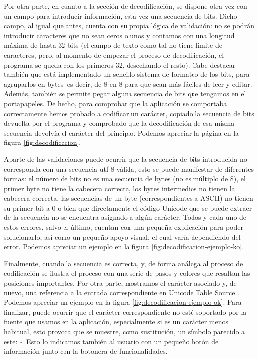 \documentclass{article}
\begin{document}
Por otra parte, en cuanto a la sección de decodificación, se dispone otra vez
con un campo para introducir información, esta vez una secuencia de bits. Dicho
campo, al igual que antes, cuenta con su propia lógica de validación: no se
podrán introducir caracteres que no sean ceros o unos y contamos con una
longitud máxima de hasta 32 bits (el campo de texto como tal no tiene límite de
caracteres, pero, al momento de empezar el proceso de decodificación, el programa
se queda con los primeros 32, desechando el resto). Cabe destacar también que
está implementado un sencillo sistema de formateo de los bits, para agruparlos
en bytes, es decir, de 8 en 8 para que sean más fáciles de leer y editar.
Además, también se permite pegar alguna secuencia de bits que tengamos en el
portapapeles. De hecho, para comprobar que la aplicación se comportaba
correctamente hemos probado a codificar un carácter, copiado la secuencia de
bits devuelta por el programa y comprobado que la decodificación de esa misma
secuencia devolvía el carácter del principio. Podemos apreciar la página en la
figura \ref{fig:decodificacion}.

Aparte de las validaciones puede ocurrir que la secuencia de bits introducida no
corresponda con una secuencia utf-8 válida, esto se puede manifestar de
diferentes formas: el número de bits no es una secuencia de bytes (no es
múltiplo de 8), el primer byte no tiene la cabecera correcta, los bytes
intermedios no tienen la cabecera correcta, las secuencias de un byte
(correspondientes a ASCII) no tienen su primer bit a 0 o bien que directamente
el código Unicode que se puede extraer de la secuencia no se encuentra asignado
a algún carácter. Todos y cada uno de estos errores, salvo el último, cuentan
con una pequeña explicación para poder solucionarlo, así como un pequeño apoyo
visual, el cual varía dependiendo del error. Podemos apreciar un ejemplo en la
figura \ref{fig:decodificacion-ejemplo-ko}.

Finalmente, cuando la secuencia es correcta, y, de forma análoga al proceso de
codificación se ilustra el proceso con una serie de pasos y colores que resaltan
las posiciones importantes. Por otra parte, mostramos el carácter asociado y, de
nuevo, una referencia a la entrada correspondiente en Unicode Table Source
\cite{unicode-table-source}. Podemos apreciar un ejemplo en la figura
\ref{fig:decodificacion-ejemplo-ok}. Para finalizar, puede ocurrir que el
carácter correspondiente no esté soportado por la fuente que usamos en la
aplicación, especialmente si es un carácter menos habitual, esto provoca que se
muestre, como sustitución, un símbolo parecido a este: $\square$. Esto lo indicamos
también al usuario con un pequeño botón de información junto con la botonera de
funcionalidades.
\end{document}
